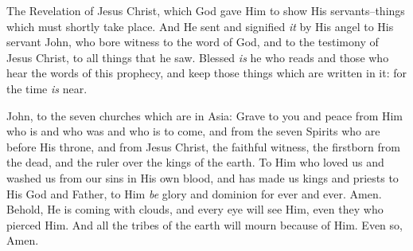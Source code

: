 
\bverse The Revelation of Jesus Christ, which God gave Him to show His servants--things which must shortly take place. And He sent and signified \textit{it} by His angel to His servant John,
\bverse who bore witness to the word of God, and to the testimony of Jesus Christ, to all things that he saw.
\bverse Blessed \textit{is} he who reads and those who hear the words of this prophecy, and keep those things which are written in it: for the time \textit{is} near.


\bverse John, to the seven churches which are in Asia: Grave to you and peace from Him who is and who was and who is to come, and from the seven Spirits who are before His throne,
\bverse and from Jesus Christ, the faithful witness, the firstborn from the dead, and the ruler over the kings of the earth. To Him who loved us and washed us from our sins in His own blood,
\bverse and has made us kings and priests to His God and Father, to Him \textit{be} glory and dominion for ever and ever. Amen.
\bverse Behold, He is coming with clouds, and every eye will see Him, even they who pierced Him. And all the tribes of the earth will mourn because of Him. Even so, Amen.
\bverse 
\bverse 
\bverse 
\bverse 
\bverse 
\bverse 
\bverse 
\bverse 
\bverse 
\bverse 
\bverse 
\bverse 
\bverse 
